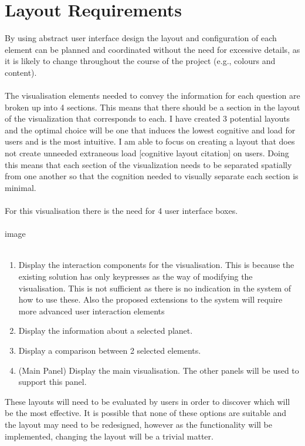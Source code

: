 \documentclass[11pt
              , a4paper
              , twoside
              , openright
              ]{report}
\begin{document}
\section{Layout Requirements}
By using abstract user interface design the layout and configuration of each element can be planned and coordinated without the need for excessive details, as it is likely to change throughout the course of the project (e.g., colours and content).
\\\\
The visualisation elements needed to convey the information for each question are broken up into 4 sections. This means that there should be a section in the layout of the visualization that corresponds to each. I have created 3 potential layouts and the optimal choice will be one that induces the lowest cognitive and load for users and is the most intuitive.  I am able to focus on creating a layout that does not create unneeded extraneous load [cognitive layout citation] on users. Doing this means that each section of the visualization needs to be separated spatially from one another so that the cognition needed to visually separate each section is minimal.  
\\\\
For this visualisation there is the need for 4 user interface boxes. 
\\\\
image
\\\\
\begin{enumerate}
 \item Display the interaction components for the visualisation. This is because the existing solution has only keypresses as the way of modifying the visualisation. This is not sufficient as there is no indication in the system of how to use these. Also the proposed extensions to the system will require more advanced user interaction elements
\item Display the information about a selected planet.
\item Display a comparison between 2 selected elements.
\item (Main Panel) Display the main visualisation. The other panels will be used to support this panel.
\end{enumerate}
These layouts will need to be evaluated by users in order to discover which will be the most effective. It is possible that none of these options are suitable and the layout may need to be redesigned, however as the functionality will be implemented, changing the layout will be a trivial matter. 
\end{document}
